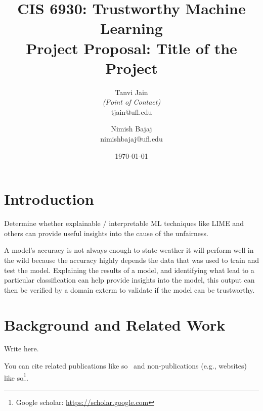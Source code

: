 \documentclass[11pt,letterpaper]{article}
\title{CIS 6930: Trustworthy Machine Learning\\
	\Large Project Proposal: Title of the Project} %
\author{
        Tanvi Jain \\{\em (Point of Contact)} \\
        tjain@ufl.edu\\
        \and
        Nimish Bajaj \\
        nimishbajaj@ufl.edu\\
}
\date{\today}
\begin{document}

\maketitle




\section{Introduction}


Determine whether explainable / interpretable ML techniques like LIME and others can provide useful insights into the cause of the unfairness.

A model's accuracy is not always enough to state weather it will perform well in the wild because the accuracy highly depends the data that was used to train and test the model. Explaining the results of a model, and identifying what lead to a particular classification can help provide insights into the model, this output can then be verified by a domain exterm to validate if the model can be trustworthy.

\section{Background and Related Work}

Write here.

You can cite related publications like so~\cite{vapnik1994measuring} and non-publications (e.g., websites) like so\footnote{Google scholar: \url{https://scholar.google.com}}.


\end{document}
